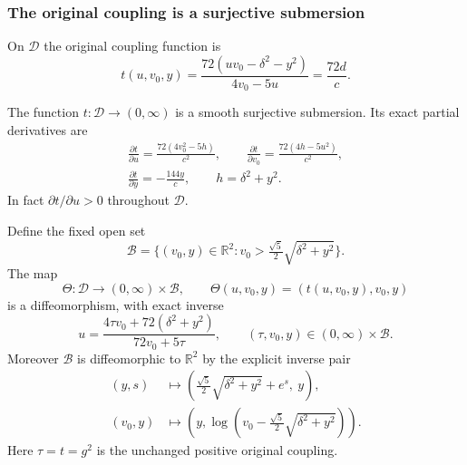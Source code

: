 \subsubsection{The original coupling is a surjective submersion}

On $\mathcal D$ the original coupling function is
\[
 t(u,v_0,y)=\frac{72(uv_0-\delta^2-y^2)}{4v_0-5u}
          =\frac{72d}{c}.
\]

\begin{theorem}
\label{sgd:smooth-addon:coupling}
The function $t:\mathcal D\to(0,\infty)$ is a smooth surjective
submersion. Its exact partial derivatives are
\begin{equation}
 \begin{gathered}
 \frac{\partial t}{\partial u}
 =\frac{72(4v_0^2-5h)}{c^2},\qquad
 \frac{\partial t}{\partial v_0}
 =\frac{72(4h-5u^2)}{c^2},\\
 \frac{\partial t}{\partial y}=-\frac{144y}{c},
 \qquad h=\delta^2+y^2.
 \end{gathered}
 \label{sgd:smooth-addon:derivatives}
\end{equation}
In fact $\partial t/\partial u>0$ throughout $\mathcal D$.

Define the fixed open set
\[
 \mathcal B=\{(v_0,y)\in\mathbb R^2:
        v_0>\tfrac{\sqrt5}{2}\sqrt{\delta^2+y^2}\}.
\]
The map
\begin{equation}
 \Theta:\mathcal D\longrightarrow(0,\infty)\times\mathcal B,
 \qquad \Theta(u,v_0,y)=(t(u,v_0,y),v_0,y)
 \label{sgd:smooth-addon:trivialization}
\end{equation}
is a diffeomorphism, with exact inverse
\begin{equation}
 u=\frac{4\tau v_0+72(\delta^2+y^2)}{72v_0+5\tau},
 \qquad (\tau,v_0,y)\in(0,\infty)\times\mathcal B.
 \label{sgd:smooth-addon:coupling-inverse}
\end{equation}
Moreover $\mathcal B$ is diffeomorphic to $\mathbb R^2$ by the
explicit inverse pair
\begin{equation}
 \begin{aligned}
 (y,s)&\longmapsto
 \left(\tfrac{\sqrt5}{2}\sqrt{\delta^2+y^2}+e^s,\ y\right),\\
 (v_0,y)&\longmapsto
 \left(y,\log\!\left(v_0-\tfrac{\sqrt5}{2}\sqrt{\delta^2+y^2}\right)\right).
 \end{aligned}
 \label{sgd:smooth-addon:B-chart}
\end{equation}
Here $\tau=t=g^2$ is the unchanged positive original coupling.
\end{theorem}

